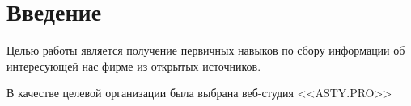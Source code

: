 \chapter{Введение}

Целью работы является получение первичных навыков по сбору информации об интересующей нас фирме из открытых источников.

В качестве целевой организации была выбрана веб-студия <<ASTY.PRO>>


